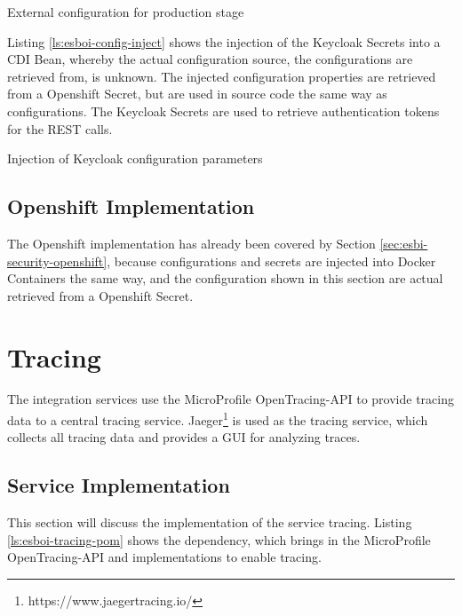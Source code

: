 \begin{listing}
	\caption{External configuration for production stage}
	\label{ls:esboi-config-project-stages-prod}
\end{listing}

Listing \vref{ls:esboi-config-inject} shows the injection of the Keycloak Secrets into a CDI Bean, whereby the actual configuration source, the configurations are retrieved from, is unknown. The injected configuration properties are retrieved from a Openshift Secret, but are used in source code the same way as configurations. The Keycloak Secrets are used to retrieve authentication tokens for the REST calls. 

\begin{listing}
	\caption{Injection of Keycloak configuration parameters}
	\label{ls:esboi-config-inject}
\end{listing}

\subsection{Openshift Implementation}
\label{sec:esbi-config-openshift}
The Openshift implementation has already been covered by Section \vref{sec:esbi-security-openshift}, because configurations and secrets are injected into Docker Containers the same way, and the configuration shown in this section are actual retrieved from a Openshift Secret. 

\section{Tracing}
\label{sec:esbi-tracing}
The integration services use the MicroProfile OpenTracing-API to provide tracing data to a central tracing service. Jaeger\footnote{https://www.jaegertracing.io/} is used as the tracing service, which collects all tracing data and provides a GUI for analyzing traces. 

\subsection{Service Implementation}
\label{sec:esbi-tracing-service}
This section will discuss the implementation of the service tracing. Listing \vref{ls:esboi-tracing-pom} shows the dependency, which brings in the MicroProfile OpenTracing-API and implementations to enable tracing. 

